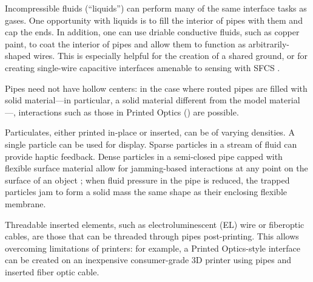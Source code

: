 Incompressible fluids (``liquids'') can perform many of the same interface tasks as gases.  One opportunity with liquids is to fill the interior of pipes with them and cap the ends.  In addition, one can use driable conductive fluids, such as copper paint, to coat the interior of pipes and allow them to function as arbitrarily-shaped wires.  This is especially helpful for the creation of a shared ground, or for creating single-wire capacitive interfaces amenable to sensing with SFCS \cite{Sato-touche}.

Pipes need not have hollow centers: in the case where routed pipes are filled with solid material---in particular, a solid material different from the model material---, interactions such as those in Printed Optics (\cite{Willis-printedoptics}) are possible.

Particulates, either printed in-place or inserted, can be of varying densities.  A single particle can be used for display.  Sparse particles in a stream of fluid can provide haptic feedback.  Dense particles in a semi-closed pipe capped with flexible surface material allow for jamming-based interactions at any point on the surface of an object \cite{Follmer-jamming}; when fluid pressure in the pipe is reduced, the trapped particles jam to form a solid mass the same shape as their enclosing flexible membrane.

Threadable inserted elements, such as electroluminescent (EL) wire or fiberoptic cables, are those that can be threaded through pipes post-printing.  This allows overcoming limitations of printers: for example, a Printed Optics-style interface can be created on an inexpensive consumer-grade 3D printer using pipes and inserted fiber optic cable.